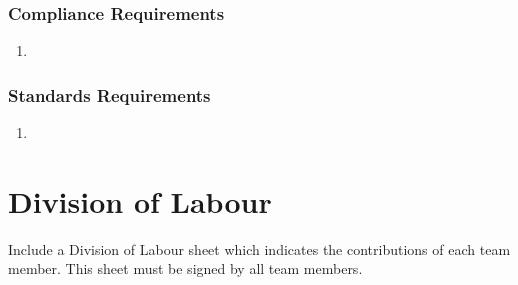 \documentclass[titlepage]{article}
\begin{document}
\subsubsection{Compliance Requirements}
\label{ssub:compliance_requirements}
\begin{enumerate}[{LR}1. ]
	\item 
\end{enumerate}

\subsubsection{Standards Requirements}
\label{ssub:standards_requirements}
\begin{enumerate}[{LR}1. ]
	\item 
\end{enumerate}



\clearpage{}
\appendix
\section{Division of Labour}
\label{sec:division_of_labour}
Include a Division of Labour sheet which indicates the contributions of each team member. This sheet must be signed by all team members.


\iffalse
\newpage
\section*{IMPORTANT NOTES}
\begin{itemize}
	\item Be sure to include all sections of the template in your document regardless whether you have something to write for each or not
	\begin{itemize}
		\item If you do not have anything to write in a section, indicate this by the \emph{N/A}, \emph{void}, \emph{none}, etc.
	\end{itemize}
	\item Uniquely number each of your requirements for easy identification and cross-referencing
	\item Highlight terms that are defined in Section~1.3 (\textbf{Definitions, Acronyms, and Abbreviations}) with \textbf{bold}, \emph{italic} or \underline{underline}
	\item For Deliverable 1, please highlight, in some fashion, all (you may have more than one) creative and innovative features. Your creative and innovative features will generally be described in Section~2.2 (\textbf{Product Functions}), but it will depend on the type of creative or innovative features you are including.
\end{itemize}
\fi
\end{document}
